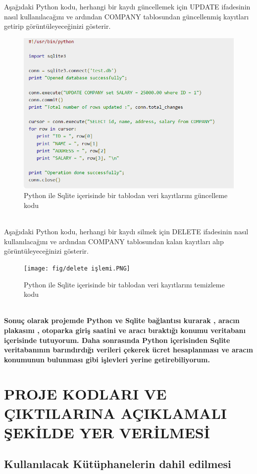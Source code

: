 Aşağıdaki Python kodu, herhangi bir kaydı güncellemek için UPDATE ifadesinin nasıl kullanılacağını ve ardından COMPANY tablosundan güncellenmiş kayıtları getirip görüntüleyeceğinizi gösterir.
\begin{figure}
    \centering
    \includegraphics{fig/UPDATE.PNG}
    \caption{Python ile Sqlite içerisinde bir tablodan veri kayıtlarını güncelleme kodu}
    \label{fig:my_label}
\end{figure} \\
Aşağıdaki Python kodu, herhangi bir kaydı silmek için DELETE ifadesinin nasıl kullanılacağını ve ardından COMPANY tablosundan kalan kayıtları alıp görüntüleyeceğinizi gösterir.
\begin{figure}
    \centering
    \texttt{[image: fig/delete işlemi.PNG]}
    \caption{Python ile Sqlite içerisinde bir tablodan veri kayıtlarını temizleme kodu}
    \label{fig:my_label}
\end{figure} \\
\textbf{Sonuç olarak projemde Python ve Sqlite bağlantısı kurarak , aracın plakasını , otoparka giriş saatini ve aracı bıraktığı konumu veritabanı içerisinde tutuyorum. Daha sonrasında Python içerisinden Sqlite veritabanının barındırdığı verileri çekerek ücret hesaplanması ve aracın konumunun bulunması gibi işlevleri yerine getirebiliyorum. }

\section{PROJE KODLARI VE ÇIKTILARINA AÇIKLAMALI ŞEKİLDE YER VERİLMESİ }
\subsection{Kullanılacak Kütüphanelerin dahil edilmesi}

